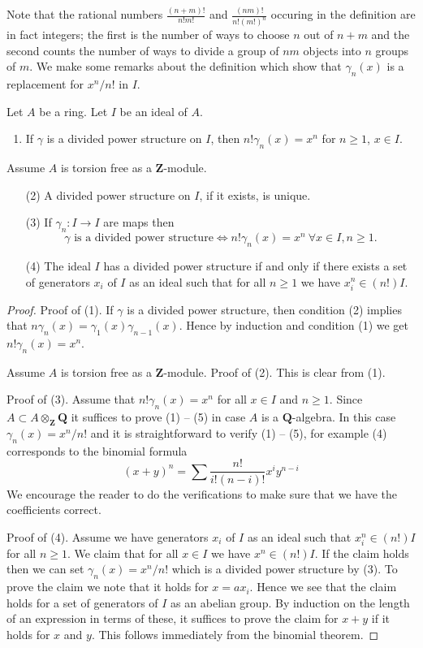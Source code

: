 \noindent
Note that the rational numbers $\frac{(n + m)!}{n! m!}$
and $\frac{(nm)!}{n! (m!)^n}$ occuring in the definition are in fact integers;
the first is the number of ways to choose $n$ out of $n + m$ and
the second counts the number of ways to divide a group of $nm$
objects into $n$ groups of $m$.
We make some remarks about the definition which show that
$\gamma_n(x)$ is a replacement for $x^n/n!$ in $I$.

\begin{lemma}
\label{lemma-silly}
Let $A$ be a ring. Let $I$ be an ideal of $A$.
\begin{enumerate}
\item If $\gamma$ is a divided power structure on $I$, then
$n! \gamma_n(x) = x^n$ for $n \geq 1$, $x \in I$.
\end{enumerate}
Assume $A$ is torsion free as a $\mathbf{Z}$-module.
\begin{enumerate}
\item[(2)] A divided power structure on $I$, if it exists, is unique.
\item[(3)] If $\gamma_n : I \to I$ are maps then
$$
\gamma\text{ is a divided power structure}
\Leftrightarrow
n! \gamma_n(x) = x^n\ \forall x \in I, n \geq 1.
$$
\item[(4)] The ideal $I$ has a divided power structure
if and only if there exists
a set of generators $x_i$ of $I$ as an ideal such that
for all $n \geq 1$ we have $x_i^n \in (n!)I$.
\end{enumerate}
\end{lemma}

\begin{proof}
Proof of (1). If $\gamma$ is a divided power structure, then condition
(2) implies that $n \gamma_n(x) = \gamma_1(x)\gamma_{n - 1}(x)$. Hence
by induction and condition (1) we get $n! \gamma_n(x) = x^n$.

\medskip\noindent
Assume $A$ is torsion free as a $\mathbf{Z}$-module.
Proof of (2). This is clear from (1).

\medskip\noindent
Proof of (3). Assume that $n! \gamma_n(x) = x^n$ for all $x \in I$ and
$n \geq 1$. Since $A \subset A \otimes_{\mathbf{Z}} \mathbf{Q}$ it suffices
to prove (1) -- (5) in case $A$ is a $\mathbf{Q}$-algebra.
In this case $\gamma_n(x) = x^n/n!$ and it is straightforward
to verify (1) -- (5), for example (4) corresponds to the binomial
formula
$$
(x + y)^n = \sum \frac{n!}{i!(n - i)!} x^iy^{n - i}
$$
We encourage the reader to do the verifications
to make sure that we have the coefficients correct.

\medskip\noindent
Proof of (4). Assume we have generators $x_i$ of $I$ as an ideal
such that $x_i^n \in (n!)I$ for all $n \geq 1$. We claim that
for all $x \in I$ we have $x^n \in (n!)I$. If the claim holds then
we can set $\gamma_n(x) = x^n/n!$ which is a divided power structure by (3).
To prove the claim we note that it holds for $x = ax_i$. Hence we see
that the claim holds for a set of generators of $I$ as an abelian group.
By induction on the length of an expression in terms of these, it suffices
to prove the claim for $x + y$ if it holds for $x$ and $y$. This
follows immediately from the binomial theorem.
\end{proof}

